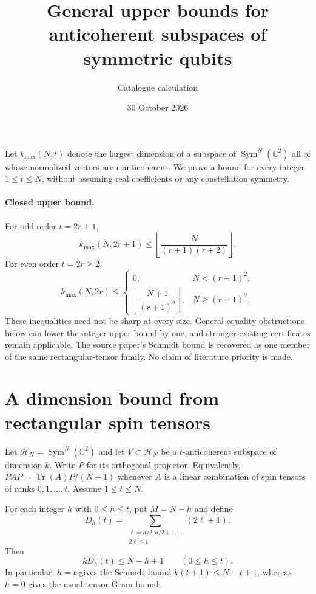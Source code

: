 \documentclass[11pt]{article}
\begin{document}
\title{General upper bounds for anticoherent subspaces of symmetric qubits}
\author{Catalogue calculation}
\date{30 October 2026}
\maketitle
Let $k_{\max}(N,t)$ denote the largest dimension of a subspace of $\operatorname{Sym}^N(\mathbb C^2)$ all of whose normalized vectors are $t$-anticoherent. We prove a bound for every integer $1\le t\le N$, without assuming real coefficients or any constellation symmetry.
\paragraph{Closed upper bound.}
For odd order $t=2r+1$,
\[
\boxed{k_{\max}(N,2r+1)\le\left\lfloor\frac{N}{(r+1)(r+2)}\right\rfloor.}
\]
For even order $t=2r\ge2$,
\[
\boxed{k_{\max}(N,2r)\le
\begin{cases}0,&N<(r+1)^2,\\
\left\lfloor\dfrac{N+1}{(r+1)^2}\right\rfloor,&N\ge(r+1)^2.
\end{cases}}
\]
These inequalities need not be sharp at every size. General equality obstructions below can lower the integer upper bound by one, and stronger existing certificates remain applicable. The source paper's Schmidt bound is recovered as one member of the same rectangular-tensor family. No claim of literature priority is made.
\section{A dimension bound from rectangular spin tensors}
Let $\mathcal H_N=\operatorname{Sym}^N(\mathbb C^2)$ and let
$V\subset\mathcal H_N$ be a $t$-anticoherent subspace of dimension $k$.
Write $P$ for its orthogonal projector. Equivalently,
$P A P=\operatorname{Tr}(A)P/(N+1)$ whenever $A$ is a linear
combination of spin tensors of ranks $0,1,\ldots,t$.
Assume $1\le t\le N$.

For each integer $h$ with $0\le h\le t$, put $M=N-h$ and define
\[
 D_h(t)=\sum_{\substack{\ell=h/2,h/2+1,\ldots\\2\ell\le t}}(2\ell+1).
\]
Then
\begin{equation}\label{eq:rectangular-general}
 \boxed{\quad kD_h(t)\le N-h+1\qquad(0\le h\le t).\quad}
\end{equation}
In particular, $h=t$ gives the Schmidt bound
$k(t+1)\le N-t+1$, whereas $h=0$ gives the usual tensor-Gram bound.
\end{document}
